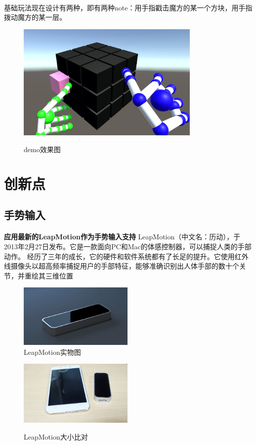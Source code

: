 \documentclass{article} \usepackage{CJK}
\begin{document}
\paragraph{}
基础玩法现在设计有两种，即有两种note：用手指戳击魔方的某一个方块，用手指拨动魔方的某一层。
\begin{figure}[H]
  \centering
  \includegraphics[width=24em]{demo.png}\\
  \caption{demo效果图}\label{4-1}
\end{figure}

\section{创新点}
\subsection{手势输入}
\paragraph{}
\textbf{应用最新的LeapMotion作为手势输入支持}
LeapMotion（中文名：历动），于2013年2月27日发布。它是一款面向PC和Mac的体感控制器，可以捕捉人类的手部动作。
经历了三年的成长，它的硬件和软件系统都有了长足的提升。它使用红外线摄像头以超高频率捕捉用户的手部特征，能够准确识别出人体手部的数十个关节，并重绘其三维位置
\begin{figure}[H]
\begin{minipage}{0.5\linewidth}
  \includegraphics[width=15em]{leap.png}\\
  \caption{LeapMotion实物图}\label{3-1}
\end{minipage}
\begin{minipage}{0.5\linewidth}
  \includegraphics[width=15em]{leapCompare.png}\\
  \caption{LeapMotion大小比对}\label{3-2}
\end{minipage}
\end{figure}
\end{document}
